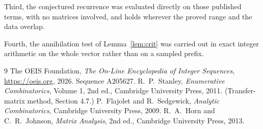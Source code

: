 \documentclass[11pt,a4paper]{article}
\theoremstyle{plain}
\theoremstyle{definition}
\begin{document}
Third, the conjectured recurrence was evaluated directly on those published terms, with no
matrices involved, and holds wherever the proved range and the data overlap.

Fourth, the annihilation test of Lemma~\ref{lem:crit} was carried out in exact integer
arithmetic on the whole vector rather than on a sampled prefix.

\begin{thebibliography}{9}
 The OEIS Foundation, \emph{The On-Line Encyclopedia of Integer
Sequences}, \url{https://oeis.org}, 2026. Sequence A205627.
 R.~P.~Stanley, \emph{Enumerative Combinatorics}, Volume 1, 2nd ed.,
Cambridge University Press, 2011. (Transfer-matrix method, Section 4.7.)
 P.~Flajolet and R.~Sedgewick, \emph{Analytic Combinatorics}, Cambridge
University Press, 2009.
 R.~A.~Horn and C.~R.~Johnson, \emph{Matrix Analysis}, 2nd ed., Cambridge
University Press, 2013.
\end{thebibliography}
\end{document}
